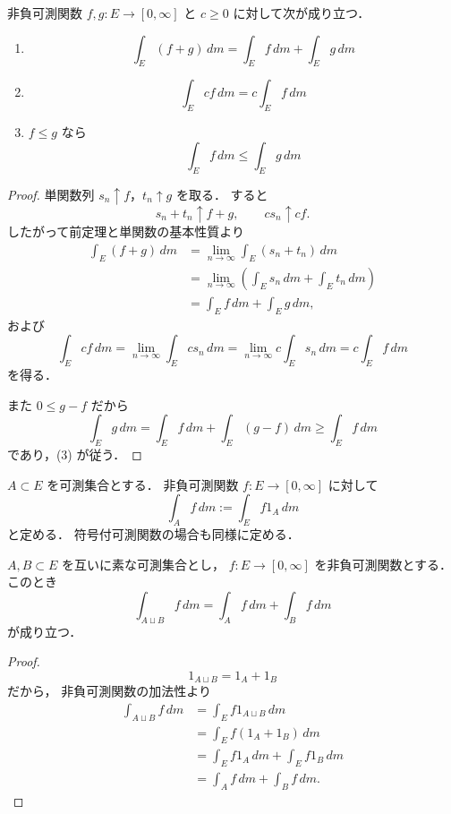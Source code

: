 \begin{proposition}[非負可測関数の基本性質]
非負可測関数 $f,g:E \to [0,\infty]$ と $c \ge 0$ に対して次が成り立つ．
\begin{enumerate}
    \item
    \[
    \int_E (f+g)\,dm = \int_E f\,dm + \int_E g\,dm
    \]
    \item
    \[
    \int_E cf\,dm = c\int_E f\,dm
    \]
    \item $f \le g$ なら
    \[
    \int_E f\,dm \le \int_E g\,dm
    \]
\end{enumerate}
\end{proposition}
\begin{proof}
単関数列 $s_n \uparrow f$，$t_n \uparrow g$ を取る．
すると
\[
s_n+t_n \uparrow f+g,
\qquad
cs_n \uparrow cf.
\]
したがって前定理と単関数の基本性質より
\begin{align*}
\int_E (f+g)\,dm
&=
\lim_{n\to\infty}\int_E (s_n+t_n)\,dm \\
&=
\lim_{n\to\infty}\left(\int_E s_n\,dm+\int_E t_n\,dm\right) \\
&=
\int_E f\,dm+\int_E g\,dm,
\end{align*}
および
\[
\int_E cf\,dm
=
\lim_{n\to\infty}\int_E cs_n\,dm
=
\lim_{n\to\infty} c\int_E s_n\,dm
=
c\int_E f\,dm
\]
を得る．

また $0 \le g-f$ だから
\[
\int_E g\,dm
=
\int_E f\,dm+\int_E (g-f)\,dm
\ge
\int_E f\,dm
\]
であり，(3) が従う．
\end{proof}

\begin{definition}[部分集合上の積分]
$A \subset E$ を可測集合とする．
非負可測関数 $f:E \to [0,\infty]$ に対して
\[
\int_A f\,dm
:=
\int_E f1_A\,dm
\]
と定める．
符号付可測関数の場合も同様に定める．
\end{definition}

\begin{proposition}[集合に関する加法性]
$A,B \subset E$ を互いに素な可測集合とし，
$f:E \to [0,\infty]$ を非負可測関数とする．
このとき
\[
\int_{A \sqcup B} f\,dm
=
\int_A f\,dm+\int_B f\,dm
\]
が成り立つ．
\end{proposition}
\begin{proof}
\[
1_{A \sqcup B}=1_A+1_B
\]
だから，
非負可測関数の加法性より
\begin{align*}
\int_{A \sqcup B} f\,dm
&=
\int_E f1_{A \sqcup B}\,dm \\
&=
\int_E f(1_A+1_B)\,dm \\
&=
\int_E f1_A\,dm+\int_E f1_B\,dm \\
&=
\int_A f\,dm+\int_B f\,dm.
\end{align*}
\end{proof}

